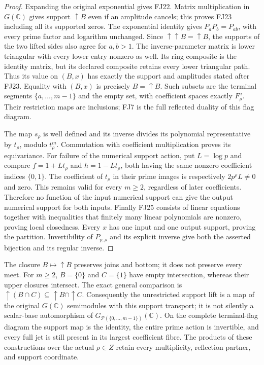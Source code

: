 \documentclass[11pt,a4paper]{article}
\theoremstyle{definition}\newtheorem{definition}[theorem]{Definition}
\newcommand{\C}{\mathbb C}\newcommand{\R}{\mathbb R}
\begin{document}
\begin{proof}
Expanding the original exponential gives FJ22. Matrix multiplication
in $G(\C)$ gives support $\uparrow B$ even if an amplitude cancels;
this proves FJ23 including all its supported zeros. The exponential
identity gives $P_aP_b=P_{ab}$, with every prime factor and logarithm
unchanged. Since $\uparrow\uparrow B=\uparrow B$, the supports of
the two lifted sides also agree for $a,b>1$. The inverse-parameter
matrix is lower triangular with every lower entry nonzero as well.
Its ring composite is the identity matrix, but its declared composite
retains every lower triangular path. Thus its value on $(B,x)$ has
exactly the support and amplitudes stated after FJ23. Equality with
$(B,x)$ is precisely $B=\uparrow B$. Such subsets are the terminal
segments $\{a,\ldots,m-1\}$ and the empty set, with coefficient
spaces exactly $F^a_\rho$. Their restriction maps are inclusions;
FJ7 is the full reflected duality of this flag diagram.

The map $s_\rho$ is well defined and its inverse divides its polynomial
representative by $t_\rho$, modulo $t_\rho^m$. Commutation with
coefficient multiplication proves its equivariance. For failure of
the numerical support action, put $L=\log p$ and compare
$f=1+Lt_\rho$ and $h=1-Lt_\rho$, both having the same nonzero
coefficient indices $\{0,1\}$. The coefficient of $t_\rho$ in their
prime images is respectively $2p^\rho L\ne0$ and zero. This remains
valid for every $m\ge2$, regardless of later coefficients.
Therefore no function of the input numerical support can give the
output numerical support for both inputs.
Finally FJ25 consists of linear equations together with inequalities
that finitely many linear polynomials are nonzero, proving local
closedness. Every $x$ has one input and one output support, proving
the partition. Invertibility of $P_{p,\rho}$ and its explicit inverse
give both the asserted bijection and its regular inverse.
\end{proof}

The closure $B\mapsto\uparrow B$ preserves joins and bottom; it
does not preserve every meet. For $m\ge2$, $B=\{0\}$ and
$C=\{1\}$ have empty intersection, whereas their upper closures
intersect. The exact general comparison is
$\uparrow(B\cap C)\subseteq\uparrow B\cap\uparrow C$.
Consequently the unrestricted support lift is a map of the original
$G(\C)$ semimodules with this support transport; it is not silently
a scalar-base automorphism of $G_{\mathcal P(\{0,\ldots,m-1\})}(\C)$.
On the complete terminal-flag diagram the support map is the identity,
the entire prime action is invertible, and every full jet is still
present in its largest coefficient fibre. The products of these
constructions over the actual $\rho\in Z$ retain every multiplicity,
reflection partner, and support coordinate.
\end{document}
